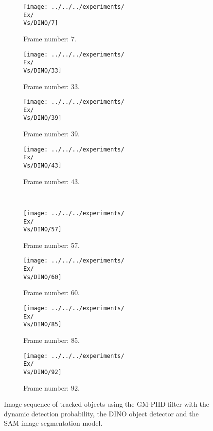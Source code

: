 \begin{figure}[H]
    \centering
    \begin{subfigure}{0.23\textwidth}
        \centering
        \texttt{[image: ../../../experiments/\\Ex/\\Vs/DINO/7]}
        \caption{Frame number: 7.}
        \label{fig:\Ex-\Vs-\Set:01}
    \end{subfigure}
    \begin{subfigure}{0.23\textwidth}
        \centering
        \texttt{[image: ../../../experiments/\\Ex/\\Vs/DINO/33]}
        \caption{Frame number: 33.}
        \label{fig:\Ex-\Vs-\Set:02}
    \end{subfigure}
    \begin{subfigure}{0.23\textwidth}
        \centering
        \texttt{[image: ../../../experiments/\\Ex/\\Vs/DINO/39]}
        \caption{Frame number: 39.}
        \label{fig:\Ex-\Vs-\Set:03}
    \end{subfigure}
    \begin{subfigure}{0.23\textwidth}
        \centering
        \texttt{[image: ../../../experiments/\\Ex/\\Vs/DINO/43]}
        \caption{Frame number: 43.}
        \label{fig:\Ex-\Vs-\Set:04}
    \end{subfigure}
    \\
    \begin{subfigure}{0.23\textwidth}
        \centering
        \texttt{[image: ../../../experiments/\\Ex/\\Vs/DINO/57]}
        \caption{Frame number: 57.}
        \label{fig:\Ex-\Vs-\Set:05}
    \end{subfigure}
    \begin{subfigure}{0.23\textwidth}
        \centering
        \texttt{[image: ../../../experiments/\\Ex/\\Vs/DINO/60]}
        \caption{Frame number: 60.}
        \label{fig:\Ex-\Vs-\Set:06}
    \end{subfigure}
    \begin{subfigure}{0.23\textwidth}
        \centering
        \texttt{[image: ../../../experiments/\\Ex/\\Vs/DINO/85]}
        \caption{Frame number: 85.}
        \label{fig:\Ex-\Vs-\Set:07}
    \end{subfigure}
    \begin{subfigure}{0.23\textwidth}
        \centering
        \texttt{[image: ../../../experiments/\\Ex/\\Vs/DINO/92]}
        \caption{Frame number: 92.}
        \label{fig:\Ex-\Vs-\Set:08}
    \end{subfigure}
    \caption{Image sequence of tracked objects using the GM-PHD filter with the dynamic detection probability, the DINO
    object detector and the SAM image segmentation model.}
    \label{fig:\Ex-\Vs-\Set}
\end{figure}




